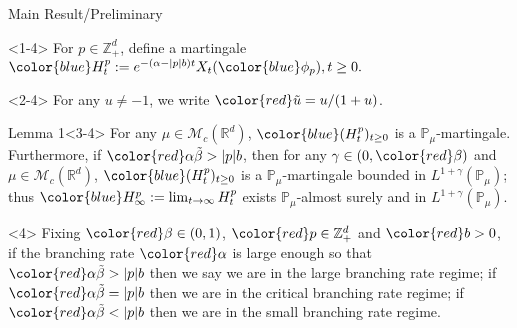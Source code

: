 \documentclass[xcolor=dvipsnames]{beamer}
\begin{document}
\begin{frame} {Main Result/Preliminary}
	\begin{block}{}<1-4>
		For $p\in \mathbb{Z}_+^d$, define a martingale
		$
		\color{blue}H_t^p
		:= e^{-(\alpha-|p|b)t}X_t({\color{blue}\phi_p}), t\geq 0.
		$
	\end{block}
	
	\begin{block}{}<2-4>
		For any $u \neq -1$, we write $\color{red}\tilde u = u/(1+ u)$.
	\end{block}
	\begin{block}{Lemma 1}<3-4>
		For any $\mu\in \mathcal M_c(\mathbb R^d)$, $\color{blue}(H_t^p)_{t\geq 0}$ is a $\mathbb{P}_{\mu}$-martingale.
		Furthermore, if $\color{red}\alpha  \tilde \beta>|p|b$, then for any $\gamma\in (0, {\color{red}\beta})$ and $\mu\in \mathcal M_c(\mathbb R^d)$,  $\color{blue}(H_t^p)_{t\geq 0}$ is a $\mathbb{P}_{\mu}$-martingale bounded in $L^{1+\gamma}(\mathbb{P}_{\mu})$;
		thus $\color{blue}H^p_{\infty}:=\lim_{t\rightarrow \infty}H_t^p$ exists $\mathbb{P}_{\mu}$-almost surely and in $L^{1+\gamma}(\mathbb P_\mu)$.
	\end{block}
	\begin{block}{}<4>
		Fixing $\color{red}\beta\in (0,1)$, $\color{red}p\in \mathbb Z_+^d$ and $\color{red}b>0$, if the {\color{PineGreen} branching rate} $\color{red} \alpha$ is large enough so that $\color{red}\alpha  \tilde \beta>|p|b$ then we say we are in {\color{PineGreen} the large branching rate regime}; if $\color{red}\alpha \tilde \beta= |p|b$ then we are in {\color{PineGreen} the critical branching rate regime};
		if $\color{red}\alpha \tilde \beta< |p|b$ then we are in {\color{PineGreen} the small branching rate regime}.
	\end{block}
\end{frame}
\end{document}
